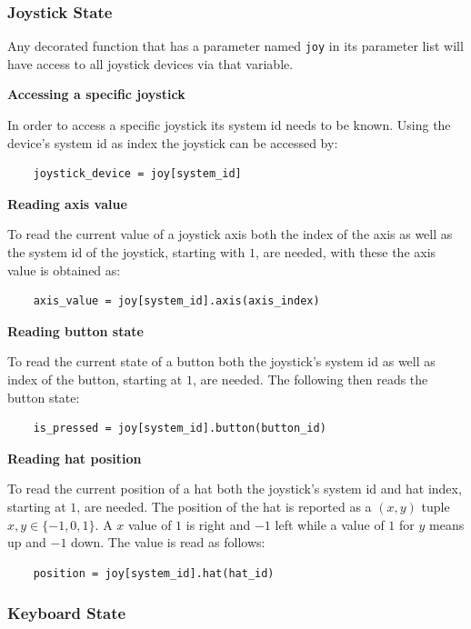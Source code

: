 \documentclass[a4, 10pt]{article}
\begin{document}
\subsubsection{Joystick State}

Any decorated function that has a parameter named \verb+joy+ in its
parameter list will have access to all joystick devices via that
variable.

\vspace{1em}
\noindent\textbf{Accessing a specific joystick}

\noindent In order to access a specific joystick its system id needs to
be known. Using the device's system id as index the joystick can be
accessed by:
\begin{verbatim}
    joystick_device = joy[system_id]
\end{verbatim}


\noindent\textbf{Reading axis value}

\noindent To read the current value of a joystick axis both the index of
the axis as well as the system id of the joystick, starting with $1$,
are needed, with these the axis value is obtained as:
\begin{verbatim}
    axis_value = joy[system_id].axis(axis_index)
\end{verbatim}


\noindent\textbf{Reading button state}

\noindent To read the current state of a button both the joystick's
system id as well as index of the button, starting at $1$, are needed.
The following then reads the button state:
\begin{verbatim}
    is_pressed = joy[system_id].button(button_id)
\end{verbatim}


\noindent\textbf{Reading hat position}

\noindent To read the current position of a hat both the joystick's
system id and hat index, starting at $1$, are needed. The position of
the hat is reported as a $(x, y)$ tuple $x, y \in \{-1, 0, 1\}$. A $x$
value of $1$ is right and $-1$ left while a value of $1$ for $y$ means
up and $-1$ down. The value is read as follows:
\begin{verbatim}
    position = joy[system_id].hat(hat_id)
\end{verbatim}


\subsubsection{Keyboard State}
\end{document}
